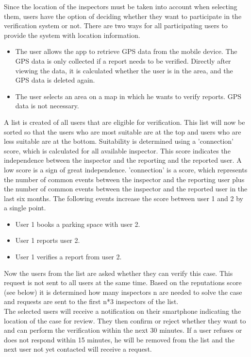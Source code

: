 \documentclass[
a4paper,     %
titlepage,   %
14pt         %
]{scrartcl}  %
\theoremstyle{mystyle}
\begin{document}
Since the location of the inspectors must be taken into account when selecting them, users have the option of deciding whether they want to participate in the verification system or not. There are two ways for all participating users to provide the system with location information. 
\begin{itemize}
\item The user allows the app to retrieve GPS data from the mobile device. The GPS data is only collected if a report needs to be verified. Directly after viewing the data, it is calculated whether the user is in the area, and the GPS data is deleted again.
\item The user selects an area on a map in which he wants to verify reports. GPS data is not necessary.
\end{itemize}

A list is created of all users that are eligible for verification. This list will now be sorted so that the users who are most suitable are at the top and users who are less suitable are at the bottom. Suitability is determined using a 'connection' score, which is calculated for all available inspector. This score indicates the independence between the inspector and the reporting and the reported user. A low score is a sign of great independence. 'connection' is a score, which represents the number of common events between the inspector and the reporting user plus the number of common events between the inspector and the reported user in the last six months. The following events increase the score between user 1 and 2 by a single point.
\begin{itemize}
\item User 1 books a parking space with user 2.
\item User 1 reports user 2.
\item User 1 verifies a report from user 2.
\end{itemize}

Now the users from the list are asked whether they can verify this case. This request is not sent to all users at the same time. Based on the reputations score (see below) it is determined how many inspectors n are needed to solve the case and requests are sent to the first n*3 inspectors of the list.\\

The selected users will receive a notification on their smartphone indicating the location of the case for review. They then confirm or reject whether they want to and can perform the verification within the next 30 minutes. If a user refuses or does not respond within 15 minutes, he will be removed from the list and the next user not yet contacted will receive a request.\\
\end{document}
